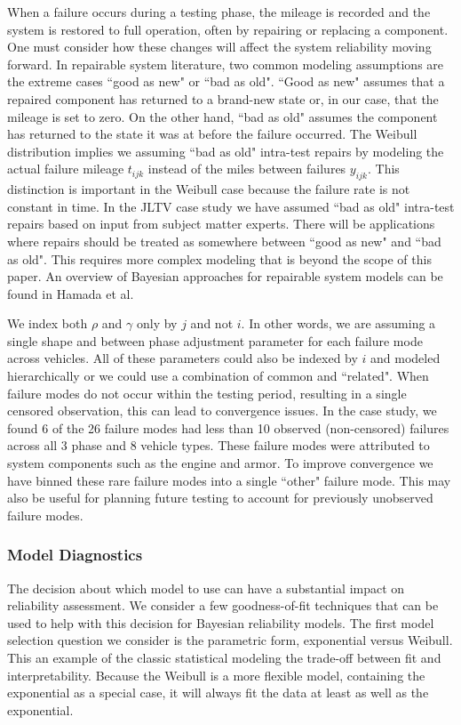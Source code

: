 \documentclass[12pt]{article}
\begin{document}
When a failure occurs during a testing phase, the mileage is recorded and the system is restored to full operation, often by repairing or replacing a component.  One must consider how these changes will affect the system reliability moving forward.  In repairable system literature, two common modeling assumptions are the extreme cases ``good as new" or ``bad as old".  ``Good as new" assumes that a repaired component has returned to a brand-new state or, in our case, that the mileage is set to zero.  On the other hand, ``bad as old" assumes the component has returned to the state it was at before the failure occurred.  The Weibull distribution implies we assuming ``bad as old" intra-test repairs by modeling the actual failure mileage $t_{ijk}$ instead of the miles between failures $y_{ijk}$.  This distinction is important in the Weibull case because the failure rate is not constant in time.  In the JLTV case study we have assumed ``bad as old" intra-test repairs based on input from subject matter experts.  There will be applications where repairs should be treated as somewhere between ``good as new" and ``bad as old".  This requires more complex modeling that is beyond the scope of this paper.  An overview of Bayesian approaches for repairable system models can be found in Hamada et al. ~\cite{ref4}

We index both $\rho$ and
$\gamma$ only by $j$ and not $i$. In other words, we are assuming a single
shape and between phase adjustment parameter for each failure mode across
vehicles.  All of these parameters could also be indexed by $i$ and modeled
hierarchically or we could use a combination of common and ``related".  When failure modes do not occur within the testing period, resulting in a single censored observation, this can lead to convergence issues.  In the case study, we found 6 of the 26 failure modes had less than 10 observed (non-censored) failures across all 3 phase and 8 vehicle types.  These failure modes were attributed to system components such as the engine and armor.  To improve convergence we have binned these rare failure modes into a single ``other" failure mode.  This may also be useful for planning future testing to account for previously unobserved failure modes.

\subsubsection{Model Diagnostics}\label{modd}
The decision about which model to
use can have a substantial impact on reliability assessment.  We consider a
few  goodness-of-fit techniques that can be used to help with this decision for Bayesian reliability models.  The
first model selection question we consider is the parametric form,
exponential versus Weibull.  This an example of the classic statistical modeling
the trade-off between fit and interpretability.  Because the Weibull is a more
flexible model, containing the exponential as a special case, it will always fit the data at least as well as the exponential.
\end{document}
